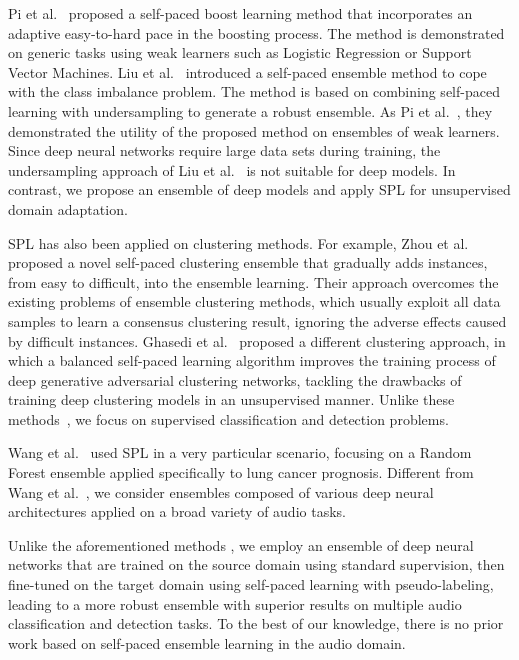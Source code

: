 \documentclass[a4paper]{article}
\begin{document}
Pi et al.~\cite{pi2016self} proposed a self-paced boost learning method that incorporates an adaptive easy-to-hard pace in the boosting process. The method is demonstrated on generic tasks using weak learners such as Logistic Regression or Support Vector Machines. Liu et al.~\cite{Liu-ICDE-2020} introduced a self-paced ensemble method to cope with the class imbalance problem. The method is based on combining self-paced learning with undersampling to generate a robust ensemble. As Pi et al.~\cite{pi2016self}, they demonstrated the utility of the proposed method on ensembles of weak learners. Since deep neural networks require large data sets during training, the undersampling approach of Liu et al.~\cite{Liu-ICDE-2020} is not suitable for deep models. In contrast, we propose an ensemble of deep models and apply SPL for unsupervised domain adaptation.

SPL has also been applied on clustering methods. For example, Zhou et al.~\cite{zhou2020self} proposed a novel self-paced clustering ensemble that gradually adds instances, from easy to difficult, into the ensemble learning. Their approach overcomes the existing problems of ensemble clustering methods, which usually exploit all data samples to learn a consensus clustering result, ignoring the adverse effects caused by difficult instances. Ghasedi et al.~\cite{ghasedi2019balanced} proposed a different clustering approach, in which a balanced self-paced learning algorithm improves the training process of deep generative adversarial clustering networks, tackling the drawbacks of training deep clustering models in an unsupervised manner. Unlike these methods~\cite{zhou2020self,ghasedi2019balanced}, we focus on supervised classification and detection problems.

Wang et al.~\cite{Wang-TMCCA-2020} used SPL in a very particular scenario, focusing on a Random Forest ensemble applied specifically to lung cancer prognosis. Different from Wang et al.~\cite{Wang-TMCCA-2020}, we consider ensembles composed of various deep neural architectures applied on a broad variety of audio tasks.

Unlike the aforementioned methods \cite{zhou2020self,pi2016self,Liu-ICDE-2020,ghasedi2019balanced,Wang-TMCCA-2020}, we employ an ensemble of deep neural networks that are  trained on the source domain using standard supervision, then  fine-tuned on the target domain using self-paced learning with pseudo-labeling, leading to a more robust ensemble with superior results on multiple audio classification and detection tasks. To the best of our knowledge, there is no prior work based on self-paced ensemble learning in the audio domain.
\end{document}

